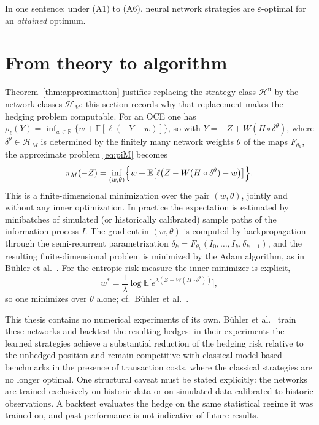 \documentclass[11pt,a4paper]{report}
\numberwithin{equation}{chapter}
\theoremstyle{plain}
\theoremstyle{definition}
\newcommand{\E}{\mathbb{E}}
\newcommand{\R}{\mathbb{R}}
\newcommand{\HH}{\mathcal{H}}
\newcommand{\Hu}{\mathcal{H}^{\mathrm{u}}}
\begin{document}
In one sentence: under (A1) to (A6), neural network strategies are
$\varepsilon$-optimal for an \emph{attained} optimum.

\section{From theory to algorithm}
\label{sec:algorithm}

Theorem~\ref{thm:approximation} justifies replacing the strategy class
$\Hu$ by the network classes $\HH_M$; this section records why that
replacement makes the hedging problem computable. For an OCE one has
$\rho_\ell(Y)=\inf_{w\in\R}\{w+\E[\ell(-Y-w)]\}$, so with
$Y=-Z+W(H\circ\delta^\theta)$, where $\delta^\theta\in\HH_M$ is
determined by the finitely many network weights $\theta$ of the maps
$F_{\theta_k}$, the approximate problem \eqref{eq:piM} becomes
\[
  \pi_M(-Z)
  =\inf_{(w,\theta)}
  \Bigl\{w+\E\bigl[\ell\bigl(Z-W(H\circ\delta^\theta)-w\bigr)\bigr]\Bigr\}.
\]
This is a finite-dimensional minimization over the pair $(w,\theta)$,
jointly and without any inner optimization. In practice the expectation
is estimated by minibatches of simulated (or historically calibrated)
sample paths of the information process $I$. The gradient in
$(w,\theta)$ is computed by backpropagation through the semi-recurrent
parametrization $\delta_k=F_{\theta_k}(I_0,\dots,I_k,\delta_{k-1})$,
and the resulting finite-dimensional problem is minimized by the Adam
algorithm, as in B\"uhler et al.\ \cite[Section~5]{buehler}. For
the entropic risk measure the inner minimizer is explicit,
\[
  w^*=\frac{1}{\lambda}\log\E\bigl[e^{\lambda(Z-W(H\circ\delta^\theta))}\bigr],
\]
so one minimizes over $\theta$ alone; cf.\ B\"uhler et al.\
\cite[Section~3.2]{buehler}.

This thesis contains no numerical experiments of its own. B\"uhler et
al.\ \cite[Section~5]{buehler} train these networks and backtest the
resulting hedges: in their experiments the learned strategies achieve a
substantial reduction of the hedging risk relative to the unhedged
position and remain competitive with classical model-based benchmarks
in the presence of transaction costs, where the classical strategies
are no longer optimal. One structural caveat must be stated explicitly:
the networks are trained exclusively on historic data or on simulated
data calibrated to historic observations. A backtest evaluates the
hedge on the same statistical regime it was trained on, and past
performance is not indicative of future results.
\end{document}
